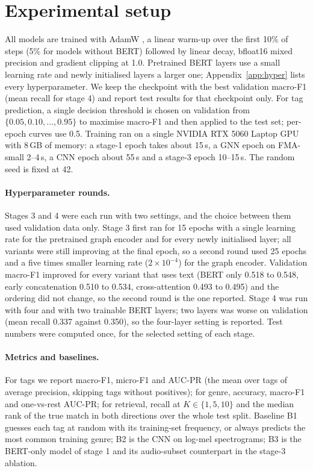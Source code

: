 \documentclass{article}
\begin{document}
\section{Experimental setup}
\label{sec:setup}

All models are trained with AdamW \citep{loshchilov2019adamw}, a linear warm-up over the first 10\% of steps (5\% for
models without BERT) followed by linear decay, bfloat16 mixed precision and gradient clipping at 1.0. Pretrained BERT
layers use a small learning rate and newly initialised layers a larger one; Appendix~\ref{app:hyper} lists every
hyperparameter. We keep the checkpoint with the best validation macro-F1 (mean recall for stage 4) and report test
results for that checkpoint only. For tag prediction, a single decision threshold is chosen on validation from
$\{0.05, 0.10, \dots, 0.95\}$ to maximise macro-F1 and then applied to the test set; per-epoch curves use 0.5. Training
ran on a single NVIDIA RTX 5060 Laptop GPU with 8\,GB of memory: a stage-1 epoch takes about 15\,s, a GNN epoch on
FMA-small 2--4\,s, a CNN epoch about 55\,s and a stage-3 epoch 10--15\,s. The random seed is fixed at 42.

\paragraph{Hyperparameter rounds.}
Stages 3 and 4 were each run with two settings, and the choice between them used validation data only. Stage 3 first
ran for 15 epochs with a single learning rate for the pretrained graph encoder and for every newly initialised layer;
all variants were still improving at the final epoch, so a second round used 25 epochs and a five times smaller
learning rate ($2\times10^{-4}$) for the graph encoder. Validation macro-F1 improved for every variant that uses text
(BERT only 0.518 to 0.548, early concatenation 0.510 to 0.534, cross-attention 0.493 to 0.495) and the ordering did
not change, so the second round is the one reported. Stage 4 was run with four and with two trainable BERT layers; two
layers was worse on validation (mean recall 0.337 against 0.350), so the four-layer setting is reported. Test numbers
were computed once, for the selected setting of each stage.

\paragraph{Metrics and baselines.}
For tags we report macro-F1, micro-F1 and AUC-PR (the mean over tags of average precision, skipping tags without
positives); for genre, accuracy, macro-F1 and one-vs-rest AUC-PR; for retrieval, recall at $K \in \{1, 5, 10\}$ and the
median rank of the true match in both directions over the whole test split. Baseline B1 guesses each tag at random with
its training-set frequency, or always predicts the most common training genre; B2 is the CNN on log-mel spectrograms;
B3 is the BERT-only model of stage 1 and its audio-subset counterpart in the stage-3 ablation.
\end{document}
